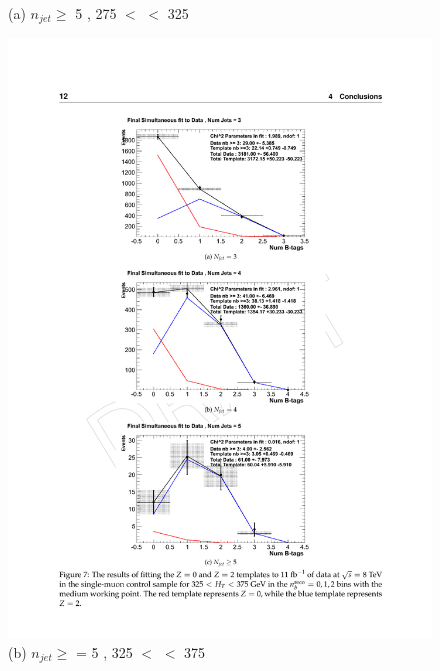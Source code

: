 \begin{figure}[ht]
\begin{minipage}[b]{0.48 \linewidth}
\centering (a) $n_{jet} \geq$  5 , 275 $<$ \theht $<$ 325
\end{minipage}
\quad
\begin{minipage}[b]{0.48\linewidth}
\includegraphics[width = 1.0\linewidth]{plots/template_data_medium_njet5_midht.pdf}
\centering (b) $n_{jet} \geq$ = 5 , 325 $<$ \theht $<$ 375 
\end{minipage}
\quad
\begin{minipage}[b]{0.48\linewidth}
\centering

\end{minipage}
\end{figure}
